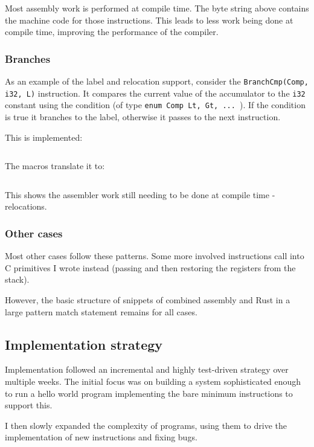 \inputminted{rust}{snippets/add_comp.rs}

Most assembly work is performed at compile time. The byte string above contains the machine code
for
those instructions. This leads to less work being done at compile time, improving the performance
of the compiler.

\subsubsection{Branches}

As an example of the label and relocation support, consider the \texttt{BranchCmp(Comp, i32, L)}
instruction. It
compares the current value of the accumulator to the \texttt{i32} constant using the condition (of
type \texttt{enum Comp {Lt, Gt, ... }}). If the condition is true it branches to the label,
otherwise it passes to the next instruction.

This is implemented:

\inputminted{rust}{snippets/branchcmp.rs}

The macros translate it to:

\inputminted{rust}{snippets/branchcmp_comp.rs}

This shows the assembler work still needing to be done at compile time - relocations.

\subsubsection{Other cases}

Most other cases follow these patterns. Some more involved instructions call into C primitives
I wrote instead (passing and then restoring the registers from the stack).

However, the basic structure of snippets of combined assembly and Rust in a large pattern match
statement remains for all cases.

\subsection{Implementation strategy}

Implementation followed an incremental and highly test-driven strategy over multiple weeks. The
initial focus was on building a system sophisticated enough to run a hello world program
implementing the bare minimum instructions to support this.

I then slowly expanded the complexity of programs, using them to drive the implementation of new
instructions and fixing bugs.

